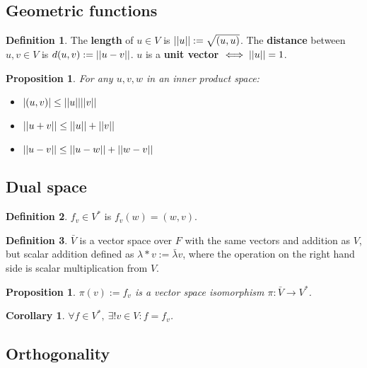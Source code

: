\documentclass[12pt]{article}
\newtheorem{cor}[thm]{Corollary}
\newtheorem{prop}[thm]{Proposition}
\theoremstyle{definition}
\newtheorem*{defn*}{Definition}
\DeclarePairedDelimiter\length{\lvert\lvert}{\rvert\rvert}
\begin{document}
\subsection{Geometric functions}

\begin{defn*}
	The \textbf{length} of $u \in V$ is $\length{u} := \sqrt{(u, u)}$.
	The \textbf{distance} between $u, v\in V$ is $d(u, v) := \length{u - v}$.
	$u$ is a \textbf{unit vector} $\iff \length{u} = 1$.
\end{defn*}

\begin{prop}
	For any $u, v, w$ in an inner product space:
	\begin{itemize}
		\item $\lvert (u, v) \rvert \leq \length{u} \length{v}$
		\item $\length{u + v} \leq \length{u} + \length{v}$
		\item $\length{u - v} \leq \length{u - w} + \length{w - v}$
	\end{itemize}
\end{prop}

\subsection{Dual space}

\begin{defn*}
	$f_v \in V^{\ast}$ is $f_v(w) = (w, v)$.
\end{defn*}

\begin{defn*}
	$\bar{V}$ is a vector space over $F$ with the same vectors and addition as $V$, but scalar addition defined as $\lambda \ast v := \bar{\lambda}v$, where the operation on the right hand side is scalar multiplication from $V$.
\end{defn*}

\begin{prop}
	 $\pi(v) := f_v$ is a vector space isomorphism $\pi : \bar{V} \to V^{\ast}$.
\end{prop}

\begin{cor}
	$\forall f \in V^{\ast},\ \exists! v \in V : f = f_v$.
\end{cor}

\subsection{Orthogonality}
\end{document}
